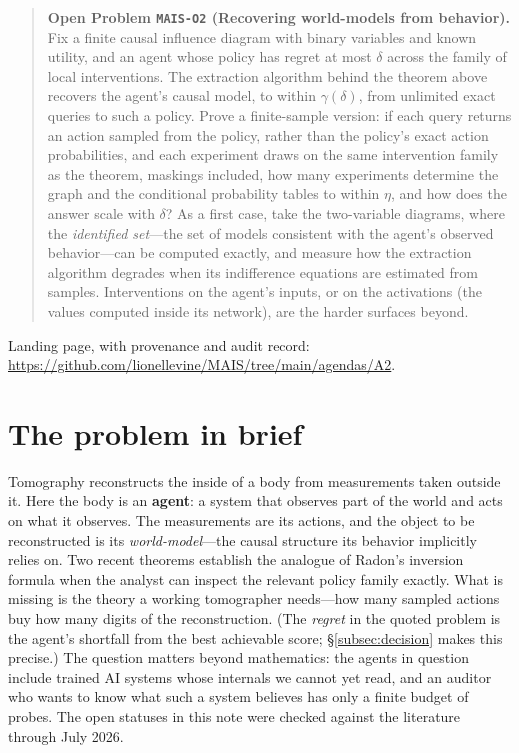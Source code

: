 \documentclass[11pt]{amsart}
\providecommand{\glsfirst}[2]{#2}
\theoremstyle{plain}
\theoremstyle{definition}
\begin{document}
\begin{quote}
\textbf{Open Problem \texttt{MAIS-O2} (Recovering world-models from behavior).}
Fix a finite causal influence diagram with binary variables and known utility, and an agent whose policy has regret at most $\delta$ across the family of local interventions. The extraction algorithm behind the theorem above~\cite{richens2024} recovers the agent's causal model, to within $\gamma(\delta)$, from unlimited exact queries to such a policy. Prove a finite-sample version: if each query returns an action sampled from the policy, rather than the policy's exact action probabilities, and each experiment draws on the same intervention family as the theorem, maskings included, how many experiments determine the graph and the conditional probability tables to within $\eta$, and how does the answer scale with $\delta$? As a first case, take the two-variable diagrams, where the \emph{identified set}---the set of models consistent with the agent's observed behavior---can be computed exactly, and measure how the extraction algorithm degrades when its indifference equations are estimated from samples. Interventions on the agent's inputs, or on the \glsfirst{activations}{activations} (the values computed inside its network), are the harder surfaces beyond.
\end{quote}

\noindent Landing page, with provenance and audit record: \url{https://github.com/lionellevine/MAIS/tree/main/agendas/A2}.

\section{The problem in brief}\label{sec:brief}



Tomography reconstructs the inside of a body from measurements taken outside it. Here the body is an \textbf{agent}: a system that observes part of the world and acts on what it observes. The measurements are its actions, and the object to be reconstructed is its \emph{world-model}---the causal structure its behavior implicitly relies on. Two recent theorems \cite{richens2024,richens2025} establish the analogue of Radon's inversion formula when the analyst can inspect the relevant policy family exactly. What is missing is the theory a working tomographer needs---how many sampled actions buy how many digits of the reconstruction. (The \emph{regret} in the quoted problem is the agent's shortfall from the best achievable score; \S\ref{subsec:decision} makes this precise.) The question matters beyond mathematics: the agents in question include trained AI systems whose internals we cannot yet read, and an auditor who wants to know what such a system believes has only a finite budget of probes. The open statuses in this note were checked against the literature through July 2026.
\end{document}
